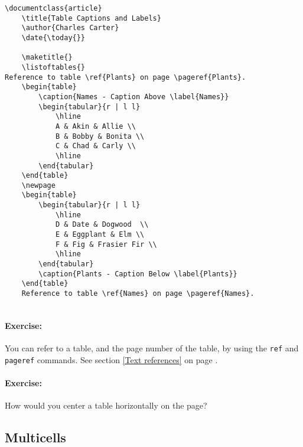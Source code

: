         \begin{verbatim}
\documentclass{article}
    \title{Table Captions and Labels}
    \author{Charles Carter}
    \date{\today{}}
 
    \maketitle{}
    \listoftables{}
Reference to table \ref{Plants} on page \pageref{Plants}.
    \begin{table}
        \caption{Names - Caption Above \label{Names}}
        \begin{tabular}{r | l l}
            \hline
            A & Akin & Allie \\
            B & Bobby & Bonita \\
            C & Chad & Carly \\
            \hline
        \end{tabular}
    \end{table}
    \newpage
    \begin{table}
        \begin{tabular}{r | l l}
            \hline
            D & Date & Dogwood  \\
            E & Eggplant & Elm \\
            F & Fig & Frasier Fir \\
            \hline
        \end{tabular}
        \caption{Plants - Caption Below \label{Plants}}
    \end{table}
    Reference to table \ref{Names} on page \pageref{Names}.
    
        \end{verbatim}

        \paragraph{Exercise:} You can refer to a table, and the page number of the table, by using the \texttt{ref} and \texttt{pageref} commands. See section \ref{Text references} on page \pageref{Text references}.

        \paragraph{Exercise:} How would you center a table horizontally on the page?



        \subsection{Multicells}
        \label{Multicells}
        
